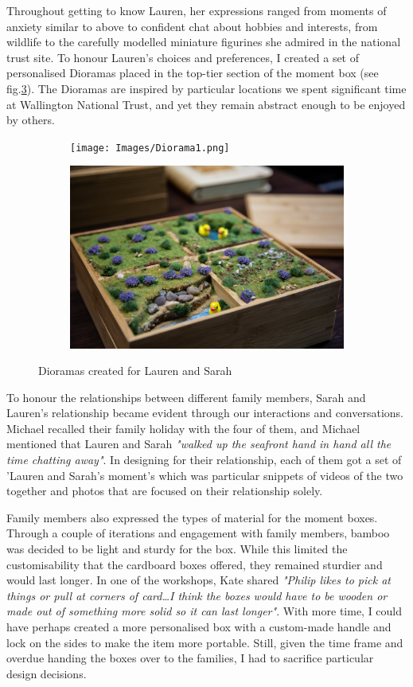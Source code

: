Throughout getting to know Lauren, her expressions ranged from moments of anxiety similar to above to confident chat about hobbies and interests, from wildlife to the carefully modelled miniature figurines she admired in the national trust site. To honour Lauren's choices and preferences, I created a set of personalised Dioramas placed in the top-tier section of the moment box (see fig.\ref{fig:Dioramas}). The Dioramas are inspired by particular locations we spent significant time at Wallington National Trust, and yet they remain abstract enough to be enjoyed by others.


\begin{figure}
\centering
\begin{subfigure}{.5\textwidth}
  \centering
  \texttt{[image: Images/Diorama1.png]}
  \label{fig:DiroamaOne}
\end{subfigure}%
\begin{subfigure}{.5\textwidth}
  \centering
  \includegraphics[width=.8\linewidth]{Images/Diroama2.png}
  \label{fig:DiroamaTwo}
\end{subfigure}
\caption{Dioramas created for Lauren and Sarah}
\label{fig:Dioramas}
\end{figure}

To honour the relationships between different family members, Sarah and Lauren's relationship became evident through our interactions and conversations. Michael recalled their family holiday with the four of them, and Michael mentioned that Lauren and Sarah \textit{"walked up the seafront hand in hand all the time chatting away"}. In designing for their relationship, each of them got a set of 'Lauren and Sarah's moment's which was particular snippets of videos of the two together and photos that are focused on their relationship solely.

Family members also expressed the types of material for the moment boxes. Through a couple of iterations and engagement with family members, bamboo was decided to be light and sturdy for the box. While this limited the customisability that the cardboard boxes offered, they remained sturdier and would last longer. In one of the workshops, Kate shared \textit{"Philip likes to pick at things or pull at corners of card…I think the boxes would have to be wooden or made out of something more solid so it can last longer"}. With more time, I could have perhaps created a more personalised box with a custom-made handle and lock on the sides to make the item more portable. Still, given the time frame and overdue handing the boxes over to the families, I had to sacrifice particular design decisions.

